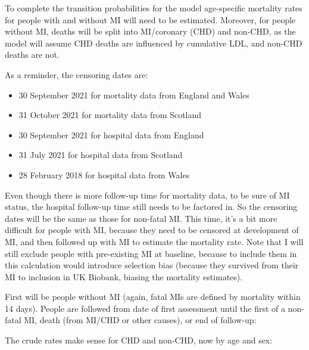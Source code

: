 \documentclass[11pt]{article}
\begin{document}
To complete the transition probabilities for the model 
age-specific mortality rates for people with and without MI will need to be estimated. 
Moreover, for people without MI, deaths will be split into MI/coronary (CHD) and non-CHD, 
as the model will assume CHD deaths are influenced by cumulative LDL, and non-CHD deaths are not. 

As a reminder, the censoring dates are:
\begin{itemize}
\item 30 September 2021 for mortality data from England and Wales
\item 31 October 2021 for mortality data from Scotland
\item 30 September 2021 for hospital data from England
\item 31 July 2021 for hospital data from Scotland
\item 28 February 2018 for hospital data from Wales
\end{itemize}

Even though there is more follow-up time for mortality data, to be sure of MI status, 
the hospital follow-up time still needs to be factored in.
So the censoring dates will be the same as those for non-fatal MI. 
This time, it's a bit more difficult for people with MI, because they need
to be censored at development of MI, and then followed up with MI to estimate
the mortality rate. 
Note that I will still exclude people with pre-existing MI at baseline, because to include them in this 
calculation would introduce selection bias (because they survived from their MI to inclusion
in UK Biobank, biasing the mortality estimates). 

First will be people without MI (again, fatal MIs are defined
by mortality within 14 days). People are followed from date of first assessment
until the first of a non-fatal MI, death (from MI/CHD or other causes), or end of follow-up: 

\color{Blue4}
\begin{stlog}\end{stlog}
\begin{stlog}\end{stlog}
\color{black}

The crude rates make sense for CHD and non-CHD, now by age and sex:

\color{Blue4}
\begin{stlog}\end{stlog}
\color{black}
\end{document}
